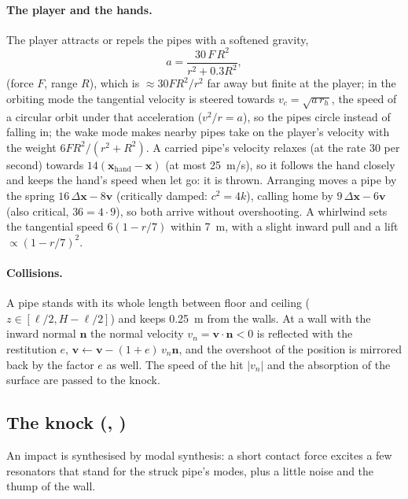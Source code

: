 \paragraph{The player and the hands.} The player attracts or repels the pipes with a softened gravity,
\begin{equation}
  a = \frac{30\,F\,R^2}{r^2 + 0.3R^2},
\end{equation}
(force $F$, range $R$), which is $\approx 30F R^2/r^2$ far away but finite at the player; in the orbiting mode the
tangential velocity is steered towards $v_c = \sqrt{a\,r_h}$, the speed of a circular orbit under that acceleration
($v^2/r = a$), so the pipes circle instead of falling in; the wake mode makes nearby pipes take on the player's velocity
with the weight $6FR^2/(r^2+R^2)$. A carried pipe's velocity relaxes (at the rate 30 per second) towards
$14(\mathbf x_\mathrm{hand} - \mathbf x)$ (at most \SI{25}{m/s}), so it follows the hand closely and keeps the hand's speed
when let go: it is thrown. Arranging moves a pipe by the spring $16\,\Delta\mathbf x - 8\mathbf v$ (critically damped:
$c^2 = 4k$), calling home by $9\,\Delta\mathbf x - 6\mathbf v$ (also critical, $36 = 4\cdot9$), so both arrive without
overshooting. A whirlwind sets the tangential speed $6(1 - r/7)$ within \SI{7}{m}, with a slight inward pull and a lift
$\propto(1-r/7)^2$.

\paragraph{Collisions.} A pipe stands with its whole length between floor and ceiling ($z\in[\ell/2, H-\ell/2]$) and
keeps \SI{0.25}{m} from the walls. At a wall with the inward normal $\mathbf n$ the normal velocity $v_n = \mathbf v\cdot\mathbf n<0$ is
reflected with the restitution $e$, $\mathbf v \leftarrow \mathbf v - (1+e)\,v_n\mathbf n$, and the overshoot of the position is
mirrored back by the factor $e$ as well. The speed of the hit $|v_n|$ and the absorption of the surface are passed to
the knock.

\subsection{The knock (, )}
\label{sec:math-impact}
An impact is synthesised by modal synthesis: a short contact force excites a few resonators that stand for the struck
pipe's modes, plus a little noise and the thump of the wall.

